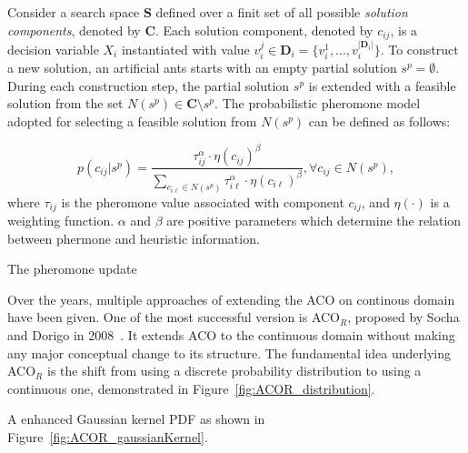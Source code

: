 Consider a search space $\boldsymbol{S}$ defined over a finit set of all possible \textit{solution components}, denoted by $\boldsymbol{C}$.
Each solution component, denoted by $c_{ij}$, is a decision variable $X_i$ instantiated with value $v^{j}_{i} \in \boldsymbol{D}_i = \{ v^{1}_{i}, ..., v^{|\boldsymbol{D}_i|}_{i}\}$.
To construct a new solution, an artificial ants starts with an empty partial solution $s^{p} = \emptyset$.
During each construction step, the partial solution $s^{p}$ is extended with a feasible solution from the set $N(s^{p}) \in \boldsymbol{C} \setminus s^{p}$.
The probabilistic pheromone model adopted for selecting a feasible solution from $N(s^{p})$ can be defined as follows:

\begin{equation}
p(c_{ij}|s^p) = \frac{\tau^{\alpha}_{ij} \cdot \eta(c_{ij})^{\beta}} 
                     {\sum_{c_{i\ell}\in N(s^{p})} \tau^{\alpha}_{i\ell} \cdot \eta(c_{i\ell})^{\beta} },  \forall c_{ij} \in N(s^{p}),
\end{equation}
where $\tau_{ij}$ is the pheromone value associated with component $c_{ij}$, and $\eta(\cdot)$ is a weighting function. 
$\alpha$ and $\beta$ are positive parameters which determine the relation between phermone and heuristic information.

The pheromone update


Over the years, multiple approaches of extending the ACO on continous domain have been given.
One of the most successful version is ACO$_{R}$, proposed by Socha and Dorigo in 2008~\cite{Socha:2008:ACOR}.
It extends ACO to the continuous domain without making any major conceptual change to its structure.
The fundamental idea underlying ACO$_{R}$ is the shift from using a discrete probability distribution to using a continuous one, demonstrated in Figure~\ref{fig:ACOR_distribution}. 

A enhanced Gaussian kernel PDF as shown in Figure~\ref{fig:ACOR_gaussianKernel}.


